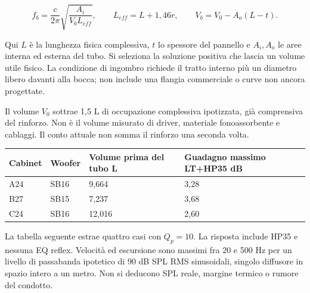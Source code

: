 \documentclass[
  italian,
  11pt,
  a4paper,
]{article}
\newcounter{none} %
\begin{document}
\[ f_b=\frac{c}{2\pi}\sqrt{\frac{A_i}{V_b L_{eff}}},\qquad L_{eff}=L+1{,}46r,\qquad V_b=V_0-A_o(L-t). \]

Qui \(L\) è la lunghezza fisica complessiva, \(t\) lo spessore del pannello e \(A_i,A_o\) le
aree interna ed esterna del tubo. Si seleziona la soluzione positiva che lascia un volume
utile fisico. La condizione di ingombro richiede il tratto interno più un diametro libero
davanti alla bocca; non include una flangia commerciale o curve non ancora progettate.

Il volume \(V_0\) sottrae 1,5 L di occupazione complessiva ipotizzata, già comprensiva del
rinforzo. Non è il volume misurato di driver, materiale fonoassorbente e cablaggi. Il conto
attuale non somma il rinforzo una seconda volta.

{\def\LTcaptype{none} %
\begin{longtable}[]{@{}llll@{}}
\toprule\noalign{}
Cabinet & Woofer & Volume prima del tubo L & Guadagno massimo LT+HP35 dB \\
\midrule\noalign{}
\endhead
\bottomrule\noalign{}
\endlastfoot
A24 & SB16 & 9,664 & 3,28 \\
B27 & SB15 & 7,237 & 3,68 \\
C24 & SB16 & 12,016 & 2,60 \\
\end{longtable}
}

La tabella seguente estrae quattro casi con \(Q_p=10\). La risposta include HP35 e nessuna
EQ reflex. Velocità ed escursione sono massimi fra 20 e 500 Hz per un livello di passabanda
ipotetico di 90 dB SPL RMS sinusoidali, singolo diffusore in spazio intero a un metro. Non
si deducono SPL reale, margine termico o rumore del condotto.
\end{document}
